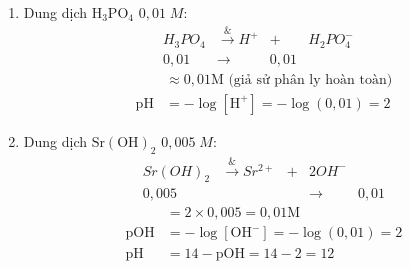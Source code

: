 \documentclass[Main.tex]{subfiles}
\begin{document}
\begin{bt}
{\begin{enumerate}
		\item Dung dịch $\mathrm{H_3PO_4}$ $0,01\;M$:
		\[\begin{array}{ccccc}
			H_3PO_4& \xrightarrow& H^+&+& H_2PO_4^-\\
			0{,}01&\rightarrow&0{,}01& &
		\end{array}\]
		\begin{align*}
			[\mathrm{H^+}] &\approx 0,01 \mathrm{M} \text{ (giả sử phân ly hoàn toàn)} \\
			\mathrm{pH} &= -\log[\mathrm{H^+}] = -\log(0,01) = 2
		\end{align*}
		\item Dung dịch $\mathrm{Sr{(OH)}_2}$ $0,005\;M$:
		\[\begin{array}{ccccc}
			Sr(OH)_2& \xrightarrow& Sr^{2+}&+& 2OH^-\\
			0{,}005&&&\rightarrow &0{,}01
		\end{array}\]
		\begin{align*}
			[\mathrm{OH^-}] &= 2 \times 0,005 = 0,01 \mathrm{M} \\
			\mathrm{pOH} &= -\log[\mathrm{OH^-}] = -\log(0,01) = 2 \\
			\mathrm{pH} &= 14 - \mathrm{pOH} = 14 - 2 = 12
		\end{align*}
	\end{enumerate}
}
\end{bt}
\end{document}
